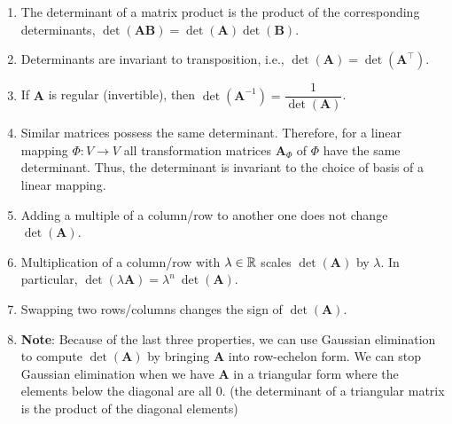 \begin{enumerate}
    \item The determinant of a matrix product is the product of the corresponding determinants, $\det(\bm{AB}) = \det(\bm{A})\det(\bm{B})$.
    \hfill \cite{mfml/book/mml/Deisenroth-Faisal-Ong}

    \item Determinants are invariant to transposition, i.e., $\det(\bm{A}) = \det(\bm{A}^\top)$.
    \hfill \cite{mfml/book/mml/Deisenroth-Faisal-Ong}

    \item If $\bm{A}$ is regular (invertible), then $\det(\bm{A} ^{-1} ) = \dfrac{1} {\det(\bm{A})}$.
    \hfill \cite{mfml/book/mml/Deisenroth-Faisal-Ong}

    \item Similar matrices possess the same determinant.
    Therefore, for a linear mapping $\Phi : V \to V$ all transformation matrices $\bm{A}_\Phi$ of $\Phi$ have the same determinant.
    Thus, the determinant is invariant to the choice of basis of a linear mapping.
    \hfill \cite{mfml/book/mml/Deisenroth-Faisal-Ong}

    \item Adding a multiple of a column/row to another one does not change $\det(\bm{A})$.
    \hfill \cite{mfml/book/mml/Deisenroth-Faisal-Ong}

    \item Multiplication of a column/row with $\lambda \in \mathbb{R}$ scales $\det(\bm{A})$ by $\lambda$.
    In particular, $\det(\lambda \bm{A}) = \lambda^ n \ \det(\bm{A})$.
    \hfill \cite{mfml/book/mml/Deisenroth-Faisal-Ong}

    \item Swapping two rows/columns changes the sign of $\det(\bm{A})$.
    \hfill \cite{mfml/book/mml/Deisenroth-Faisal-Ong}

    \item[] \textbf{Note}: Because of the last three properties, we can use Gaussian elimination to compute $\det(\bm{A})$ by bringing $\bm{A}$ into row-echelon form.
    We can stop Gaussian elimination when we have $\bm{A}$ in a triangular form where the elements below the diagonal are all $0$.
    (the determinant of a triangular matrix is the product of the diagonal elements)
\end{enumerate}









